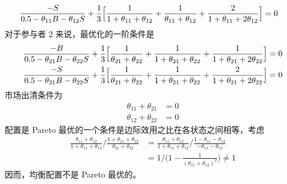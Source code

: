 \begin{solution}
\begin{enumerate}[label=(\alph*)]
\[\begin{aligned}
            \frac{-S}{0.5-\theta_{11}B-\theta_{12}S}+\frac13\Bigl[\frac{1}{1+\theta_{11}+\theta_{12}}+\frac{1}{\theta_{11}+\theta_{12}}+\frac{2}{1+\theta_{11}+2\theta_{12}}\Bigr]&=0
        \end{aligned}
    \]
    对于参与者 2 来说，最优化的一阶条件是
    \[
        \begin{aligned}
            \frac{-B}{0.5-\theta_{21}B-\theta_{22}S}+\frac13\Bigl[\frac{1}{\theta_{21}+\theta_{22}}+\frac{1}{1+\theta_{21}+\theta_{22}}+\frac{1}{1+\theta_{21}+2\theta_{22}}\Bigr]&=0\\
            \frac{-S}{0.5-\theta_{21}B-\theta_{22}S}+\frac13\Bigl[\frac{1}{\theta_{21}+\theta_{22}}+\frac{1}{1+\theta_{21}+\theta_{22}}+\frac{2}{1+\theta_{21}+2\theta_{22}}\Bigr]&=0
        \end{aligned}
    \]
    市场出清条件为
    \[
        \begin{aligned}
            \theta_{11}+\theta_{21}&=0\\
            \theta_{12}+\theta_{22}&=0
        \end{aligned}
    \]
    配置是 Pareto 最优的一个条件是边际效用之比在各状态之间相等，考虑
    \[
        \begin{aligned}
            \frac{\theta_{11}+\theta_{12}}{1+\theta_{11}+\theta_{12}}\Big/\frac{1+\theta_{21}+\theta_{22}}{\theta_{21}+\theta_{22}}
            &=\frac{\theta_{11}+\theta_{12}}{1+\theta_{11}+\theta_{12}}\Big/\frac{1-\theta_{11}-\theta_{12}}{-\theta_{11}-\theta_{12}}\\
            &=1\big/\bigl(1-\tfrac{1}{(\theta_{11}+\theta_{12})^{2}}\bigr)\ne 1
        \end{aligned}
    \]
    因而，均衡配置不是 Pareto 最优的。
\end{enumerate}
\end{solution}

